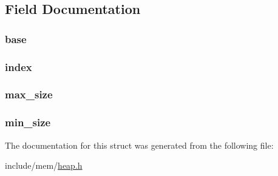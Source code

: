 \subsection{Field Documentation}
\subsubsection[{\texorpdfstring{base}{base}}]{ base}\hypertarget{structheap_ab5763c2b18c825c8b8fba44b2e60ddc1}{}\label{structheap_ab5763c2b18c825c8b8fba44b2e60ddc1}
\subsubsection[{\texorpdfstring{index}{index}}]{ index}\hypertarget{structheap_af44ecb378e6839e4c91808d259825274}{}\label{structheap_af44ecb378e6839e4c91808d259825274}
\subsubsection[{\texorpdfstring{max\+\_\+size}{max_size}}]{ max\+\_\+size}\hypertarget{structheap_aff98f60fdff673e586a88d147da4798c}{}\label{structheap_aff98f60fdff673e586a88d147da4798c}
\subsubsection[{\texorpdfstring{min\+\_\+size}{min_size}}]{ min\+\_\+size}\hypertarget{structheap_af515ec763221e45adce632886c4cb888}{}\label{structheap_af515ec763221e45adce632886c4cb888}


The documentation for this struct was generated from the following file\+:\begin{DoxyCompactItemize}
\item 
include/mem/\hyperlink{heap_8h}{heap.\+h}\end{DoxyCompactItemize}
